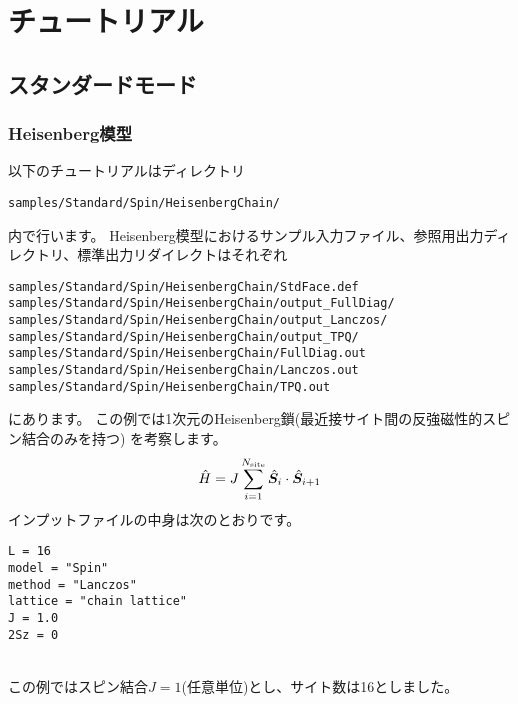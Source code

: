 \chapter{チュートリアル}
\label{Ch:model}
\section{スタンダードモード}
\label{Sec:StandardMode}

\subsection{Heisenberg模型}

以下のチュートリアルはディレクトリ
\begin{verbatim}
samples/Standard/Spin/HeisenbergChain/
\end{verbatim}
内で行います。
Heisenberg模型におけるサンプル入力ファイル、参照用出力ディレクトリ、標準出力リダイレクトはそれぞれ
\begin{verbatim}
samples/Standard/Spin/HeisenbergChain/StdFace.def
samples/Standard/Spin/HeisenbergChain/output_FullDiag/
samples/Standard/Spin/HeisenbergChain/output_Lanczos/
samples/Standard/Spin/HeisenbergChain/output_TPQ/
samples/Standard/Spin/HeisenbergChain/FullDiag.out
samples/Standard/Spin/HeisenbergChain/Lanczos.out
samples/Standard/Spin/HeisenbergChain/TPQ.out
\end{verbatim}
にあります。
この例では1次元のHeisenberg鎖(最近接サイト間の反強磁性的スピン結合のみを持つ)
を考察します。
\begin{align}
  {\hat H} = J \sum_{i=1}^{N_{\rm site}} {\hat {\boldsymbol S}}_i \cdot {\hat {\boldsymbol S}}_{i+1}
\end{align}
インプットファイルの中身は次のとおりです。
\\
\begin{minipage}{10cm}
\begin{screen}
\begin{verbatim}
L = 16
model = "Spin"
method = "Lanczos"
lattice = "chain lattice"
J = 1.0
2Sz = 0
\end{verbatim}
\end{screen}
\end{minipage}
%
\\
この例ではスピン結合$J=1$(任意単位)とし、サイト数は16としました。

